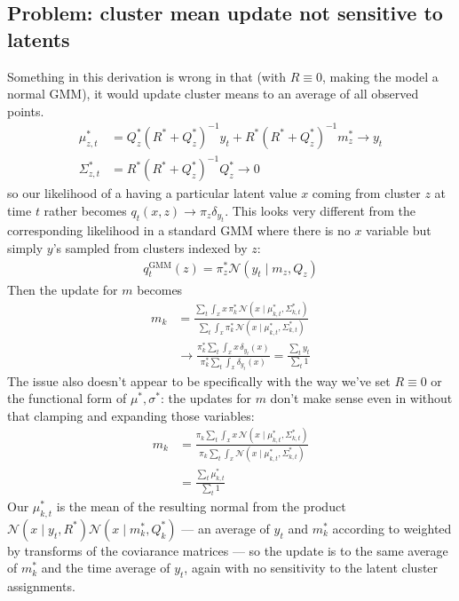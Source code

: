 \documentclass{article}         %
\newcommand{\inv}{^{-1}}
\newcommand{\NN}{\mathcal{N}}
\begin{document}
\subsection{Problem: cluster mean update not sensitive to latents}

Something in this derivation is wrong in that (with $R\equiv 0$, making the model a normal GMM), it would update cluster means to an average of all observed points.
\begin{align}
    \mu_{z,t}^* &= Q^*_z (R^* + Q^*_z)\inv y_t + R^* (R^* + Q_z^*)\inv m^*_z \rightarrow y_t\\
    \Sigma_{z, t}^* &= R^*(R^* + Q_z^*)\inv Q_z^* \rightarrow 0
\end{align}
so our likelihood of a having a particular latent value $x$ coming from cluster $z$ at time $t$ rather becomes $q_t(x, z) \rightarrow \pi_z\delta_{y_t}$. This looks very different from the corresponding likelihood in a standard GMM where there is no $x$ variable but simply $y$'s sampled from clusters indexed by $z$:
\begin{align}
    q^{\text{GMM}}_{t}(z) = \pi^*_z \NN(y_t \mid m_z, Q_z)
\end{align}
Then the update for $m$ becomes
\begin{align}
    m_k &= \frac{\sum_t\int_x x\, \pi^*_k\, \NN(x \mid \mu^*_{k, t}, \Sigma^*_{k, t})}{\sum_t\int_x \pi^*_k\, \NN(x \mid \mu^*_{k, t}, \Sigma^*_{k, t})} \\
    &\rightarrow \frac{\pi^*_k \sum_t\int_x x\,  \delta_{y_t}(x)}{\pi^*_k \sum_t\int_x \delta_{y_t}(x)}
    = \frac{\sum_{t} y_t}{\sum_t 1}
\end{align}
The issue also doesn't appear to be specifically with the way we've set $R\equiv 0$ or the functional form of $\mu^*, \sigma^*$: the updates for $m$ don't make sense even in without that clamping and expanding those variables:
\begin{align}
    m_k &= \frac{\pi_k\sum_t\int_x x\, \NN(x \mid \mu^*_{k, t}, \Sigma^*_{k, t})}{\pi_k\sum_t\int_x \NN(x \mid \mu^*_{k, t}, \Sigma^*_{k, t})} \\
   &= \frac{\sum_t \mu^*_{k, t}}{\sum_t 1}
\end{align}
Our $ \mu^*_{k, t} $ is the mean of the resulting normal from the product $\NN(x \mid y_t, R^*) \NN(x \mid m^*_{k}, Q^*_{k})$ --- an average of $y_t$ and $ m^*_{k}$ according to weighted by transforms of the coviarance matrices --- so the update is to the same average of $m^*_k$ and the time average of $y_t$, again with no sensitivity to the latent cluster assignments.
\end{document}
